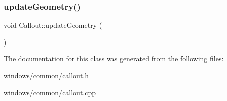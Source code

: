 \mbox{\label{class_callout_a38c97e1c4e69816abd3328d71ecf2e66}} 
\subsubsection{\texorpdfstring{update\+Geometry()}{updateGeometry()}}
{\footnotesize\ttfamily void Callout\+::update\+Geometry (\begin{DoxyParamCaption}{ }\end{DoxyParamCaption})}



The documentation for this class was generated from the following files\+:\begin{DoxyCompactItemize}
\item 
windows/common/\hyperlink{callout_8h}{callout.\+h}\item 
windows/common/\hyperlink{callout_8cpp}{callout.\+cpp}\end{DoxyCompactItemize}
